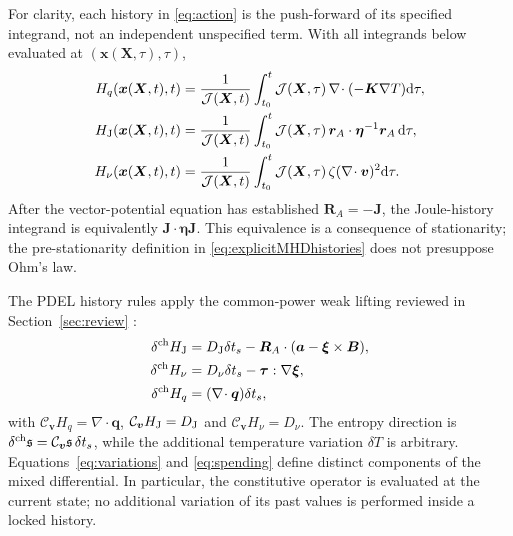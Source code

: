 \documentclass[11pt,a4paper]{article}
\theoremstyle{remark}\newtheorem{remark}{Remark}
\numberwithin{equation}{section}
\newcommand{\dd}{\mathrm{d}}
\newcommand{\vv}{\boldsymbol v}
\newcommand{\BB}{\boldsymbol B}
\newcommand{\JJ}{\boldsymbol J}
\newcommand{\xx}{\boldsymbol x}
\newcommand{\XX}{\boldsymbol X}
\newcommand{\xii}{\boldsymbol\xi}
\newcommand{\atest}{\boldsymbol a}
\newcommand{\ttau}{\boldsymbol\tau}
\newcommand{\etab}{\boldsymbol\eta}
\newcommand{\qv}{\boldsymbol q}
\newcommand{\grad}{\nabla}
\newcommand{\diver}{\nabla\!\cdot}
\newcommand{\Cv}{\mathcal C_{\vv}}
\newcommand{\st}{\mathfrak s}
\begin{document}
For clarity, each history in \eqref{eq:action} is the push-forward of its specified integrand, not an independent unspecified term. With all integrands below evaluated at $(\xx(\XX,\tau),\tau)$,
\begin{equation}
\begin{aligned}
H_q(\xx(\XX,t),t)
&=\frac1{\mathcal J(\XX,t)}\int_{t_0}^{t}\mathcal J(\XX,\tau)\,
\diver(-\boldsymbol K\grad T)\dd\tau,\\
H_{\rm J}(\xx(\XX,t),t)
&=\frac1{\mathcal J(\XX,t)}\int_{t_0}^{t}\mathcal J(\XX,\tau)\,
\boldsymbol r_A\cdot\etab^{-1}\boldsymbol r_A\,\dd\tau,\\
H_\nu(\xx(\XX,t),t)
&=\frac1{\mathcal J(\XX,t)}\int_{t_0}^{t}\mathcal J(\XX,\tau)\,
\zeta(\diver\vv)^2\dd\tau.
\end{aligned}
\label{eq:explicitMHDhistories}
\end{equation}
After the vector-potential equation has established $\boldsymbol R_A=-\JJ$, the Joule-history integrand is equivalently $\JJ\cdot\etab\JJ$. This equivalence is a consequence of stationarity; the pre-stationarity definition in \eqref{eq:explicitMHDhistories} does not presuppose Ohm's law.


The PDEL history rules apply the common-power weak lifting reviewed in Section~\ref{sec:review} \citep{RenSpending,RenEulerian,RenMultiChannel}:
\begin{equation}
\begin{aligned}
\delta^{\rm ch}H_{\rm J}
&=D_{\rm J}\delta t_s-\boldsymbol R_A\cdot(\atest-\xii\times\BB),\\
\delta^{\rm ch}H_\nu&=D_\nu\delta t_s-\ttau:\grad\xii,\\
\delta^{\rm ch}H_q&=(\diver\qv)\delta t_s,
\end{aligned}
\label{eq:spending}
\end{equation}
with $\Cv H_q=\diver\qv$, $\Cv H_{\rm J}=D_{\rm J}$ and $\Cv H_\nu=D_\nu$. The entropy direction is $\delta^{\rm ch}\st=\Cv\st\,\delta t_s$, while the additional temperature variation $\delta T$ is arbitrary. Equations~\eqref{eq:variations} and \eqref{eq:spending} define distinct components of the mixed differential. In particular, the constitutive operator is evaluated at the current state; no additional variation of its past values is performed inside a locked history.
\end{document}
